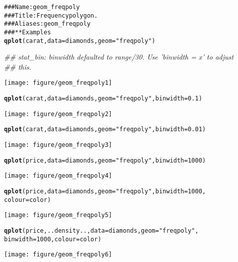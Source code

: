 \documentclass[a4paper,titlepage]{tufte-handout}\usepackage{graphicx, color}
\makeatletter
\def\maxwidth{ %
  \ifdim\Gin@nat@width>\linewidth
    \linewidth
  \else
    \Gin@nat@width
  \fi
}
\newcommand{\hlfunctioncall}[1]{\textcolor[rgb]{0.501960784313725,0,0.329411764705882}{\textbf{#1}}}%
\newcommand{\hlstring}[1]{\textcolor[rgb]{0.6,0.6,1}{#1}}%
\newcommand{\hlcomment}[1]{\textcolor[rgb]{0.180392156862745,0.6,0.341176470588235}{#1}}%
\newenvironment{kframe}{%
 \def\at@end@of@kframe{}%
 \ifinner\ifhmode%
  \def\at@end@of@kframe{\end{minipage}}%
  \begin{minipage}{\columnwidth}%
 \fi\fi%
 \def\FrameCommand##1{\hskip\@totalleftmargin \hskip-\fboxsep
 \colorbox{shadecolor}{##1}\hskip-\fboxsep
     \hskip-\linewidth \hskip-\@totalleftmargin \hskip\columnwidth}%
 \MakeFramed {\advance\hsize-\width
   \@totalleftmargin\z@ \linewidth\hsize
   \@setminipage}}%
 {\par\unskip\endMakeFramed%
 \at@end@of@kframe}
\newenvironment{knitrout}{}{} %
\makeatother
\begin{document}
\begin{knitrout}
\color{fgcolor}\begin{kframe}
\begin{alltt}
\hlcomment{### Name: geom_freqpoly}
\hlcomment{### Title: Frequency polygon.}
\hlcomment{### Aliases: geom_freqpoly}
\hlcomment{### ** Examples}
\hlfunctioncall{qplot}(carat, data = diamonds, geom = \hlstring{"freqpoly"})
\end{alltt}
\begin{flushleft}\ttfamily\noindent\itshape\textcolor{messagecolor}{\#\# stat\_bin: binwidth defaulted to range/30. Use 'binwidth = x' to adjust \\ 
\#\# this.}\end{flushleft}\end{kframe}\texttt{[image: figure/geom\_freqpoly1]} \begin{kframe}\begin{alltt}
\hlfunctioncall{qplot}(carat, data = diamonds, geom = \hlstring{"freqpoly"}, binwidth = 0.1)
\end{alltt}
\end{kframe}\texttt{[image: figure/geom\_freqpoly2]} \begin{kframe}\begin{alltt}
\hlfunctioncall{qplot}(carat, data = diamonds, geom = \hlstring{"freqpoly"}, binwidth = 0.01)
\end{alltt}
\end{kframe}\texttt{[image: figure/geom\_freqpoly3]} \begin{kframe}\begin{alltt}
\hlfunctioncall{qplot}(price, data = diamonds, geom = \hlstring{"freqpoly"}, binwidth = 1000)
\end{alltt}
\end{kframe}\texttt{[image: figure/geom\_freqpoly4]} \begin{kframe}\begin{alltt}
\hlfunctioncall{qplot}(price, data = diamonds, geom = \hlstring{"freqpoly"}, binwidth = 1000,
  colour = color)
\end{alltt}
\end{kframe}\texttt{[image: figure/geom\_freqpoly5]} \begin{kframe}\begin{alltt}
\hlfunctioncall{qplot}(price, ..density.., data = diamonds, geom = \hlstring{"freqpoly"},
  binwidth = 1000, colour = color)
\end{alltt}
\end{kframe}\texttt{[image: figure/geom\_freqpoly6]} 
\end{knitrout}
\end{document}
